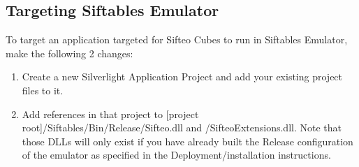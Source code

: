 \documentclass[12pt]{article}
\begin{document}
\subsection{Targeting Siftables Emulator}
To target an application targeted for Sifteo Cubes to run in Siftables Emulator, make the following 2 changes:
\begin{enumerate}
\item Create a new Silverlight Application Project and add your existing project files to it.
\item Add references in that project to [project root]/Siftables/Bin/Release/Sifteo.dll and /SifteoExtensions.dll. Note that those DLLs will only exist if you have already built the Release configuration of the emulator as specified in the Deployment/installation instructions.
\end{enumerate}
\end{document}
